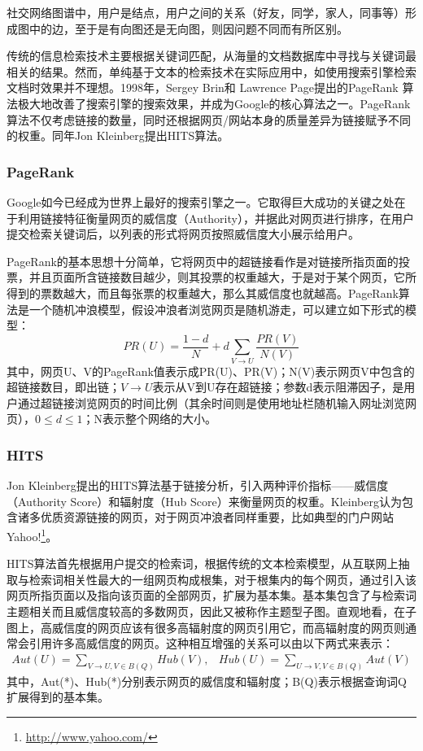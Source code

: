 社交网络图谱中，用户是结点，用户之间的关系（好友，同学，家人，同事等）形成图中的边，至于是有向图还是无向图，则因问题不同而有所区别。

传统的信息检索技术主要根据关键词匹配，从海量的文档数据库中寻找与关键词最相关的结果。然而，单纯基于文本的检索技术在实际应用中，如使用搜索引擎检索文档时效果并不理想。1998年，Sergey Brin和 Lawrence Page提出的PageRank \cite{brin1998anatomy}算法极大地改善了搜索引擎的搜索效果，并成为Google的核心算法之一。PageRank算法不仅考虑链接的数量，同时还根据网页/网站本身的质量差异为链接赋予不同的权重。同年Jon Kleinberg提出HITS算法\cite{kleinberg1999authoritative}。

\subsubsection{PageRank}
Google如今已经成为世界上最好的搜索引擎之一。它取得巨大成功的关键之处在于利用链接特征衡量网页的威信度（Authority），并据此对网页进行排序，在用户提交检索关键词后，以列表的形式将网页按照威信度大小展示给用户。

PageRank的基本思想十分简单，它将网页中的超链接看作是对链接所指页面的投票，并且页面所含链接数目越少，则其投票的权重越大，于是对于某个网页，它所得到的票数越大，而且每张票的权重越大，那么其威信度也就越高。PageRank算法是一个随机冲浪模型，假设冲浪者浏览网页是随机游走，可以建立如下形式的模型：
\begin{equation}
PR(U) = \frac{1-d}{N} + d\sum_{V\rightarrow U}{\frac{PR(V)}{N(V)}}
\end{equation}
其中，网页U、V的PageRank值表示成PR(U)、PR(V)；N(V)表示网页V中包含的超链接数目，即出链；$V\rightarrow U$表示从V到U存在超链接；参数d表示阻滞因子，是用户通过超链接浏览网页的时间比例（其余时间则是使用地址栏随机输入网址浏览网页），$0\le d \le 1$；N表示整个网络的大小。

\subsubsection{HITS}
Jon Kleinberg提出的HITS算法基于链接分析，引入两种评价指标——威信度（Authority Score）和辐射度（Hub Score）来衡量网页的权重。Kleinberg认为包含诸多优质资源链接的网页，对于网页冲浪者同样重要，比如典型的门户网站Yahoo!\footnote{\url{http://www.yahoo.com/}}。

HITS算法首先根据用户提交的检索词，根据传统的文本检索模型，从互联网上抽取与检索词相关性最大的一组网页构成根集，对于根集内的每个网页，通过引入该网页所指页面以及指向该页面的全部网页，扩展为基本集。基本集包含了与检索词主题相关而且威信度较高的多数网页，因此又被称作主题型子图。直观地看，在子图上，高威信度的网页应该有很多高辐射度的网页引用它，而高辐射度的网页则通常会引用许多高威信度的网页。这种相互增强的关系可以由以下两式来表示：
\begin{equation}\label{eq:hitsalgorithm}
    \begin{array}{cc}
        Aut(U)=\sum\limits_{V\rightarrow U,V \in B(Q)}{Hub(V)}, & Hub(U)=\sum\limits_{U\rightarrow V,V \in B(Q)}{Aut(V)}
    \end{array}
\end{equation}
其中，Aut(*)、Hub(*)分别表示网页的威信度和辐射度；B(Q)表示根据查询词Q扩展得到的基本集。
